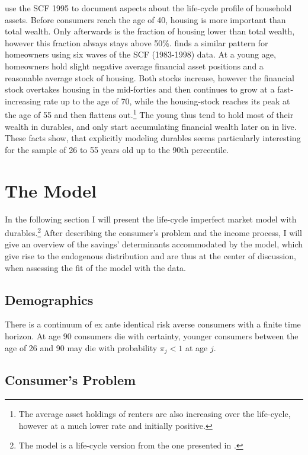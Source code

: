 \documentclass[a4paper,12pt,legno]{article}
\begin{document}
\cite{FV&K2011} use the SCF 1995 to document aspects about the life-cycle profile of household assets. Before consumers reach the age of 40, housing is more important than total wealth. Only afterwards is the fraction of housing lower than total wealth, however this fraction always stays above 50\%. \citep{yang2009} finds a similar pattern for  homeowners using six waves of the SCF (1983-1998) data. At a young age,  homeowners hold slight negative average financial asset positions and a reasonable average stock of housing. Both stocks increase, however the financial stock overtakes housing in the mid-forties and then continues to grow at a fast-increasing rate up to the age of 70, while the housing-stock reaches its peak at the age of 55 and then flattens out.\footnote{The average asset holdings of renters are also increasing over the life-cycle, however at a much lower rate and initially positive.} The young thus tend to hold most of their wealth in durables, and only start accumulating financial wealth later on in live.
\\ These facts show, that explicitly modeling durables seems particularly interesting for the sample of 26 to 55 years old up to the 90th percentile.

\section{The Model}
\label{model}
In the following section I will present the life-cycle imperfect market model with durables.\footnote{The model is a life-cycle version from the one presented in \cite{hintermaier2010}.} After describing the consumer's problem and the income process, I will give an overview  of the savings' determinants accommodated by the model, which give rise to the endogenous distribution and are thus at the center of discussion, when assessing the fit of the model with the data.

\subsection{Demographics}
There is a continuum of ex ante identical risk averse consumers with a finite time horizon. At age 90 consumers die with certainty, younger consumers between the age of 26 and 90 may die with probability $\pi_{j} < 1$ at age $j$.
\subsection{Consumer's Problem} 
\end{document}
